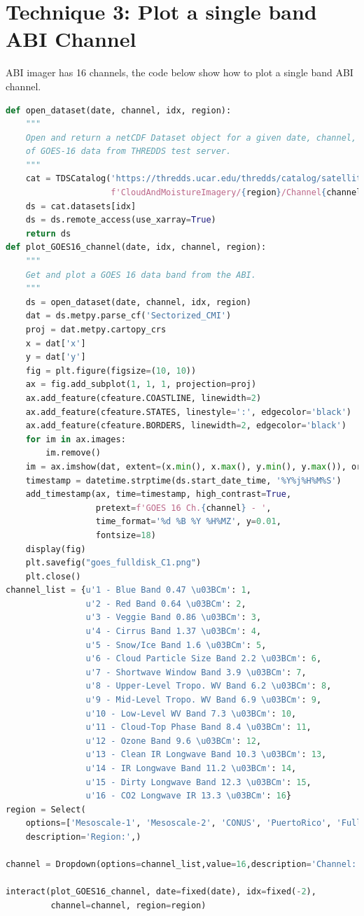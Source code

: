 \section{Technique 3: Plot a single band ABI Channel}
ABI imager has 16 channels, the code below show how to plot a single band ABI channel.
\begin{lstlisting}[language=Python]
def open_dataset(date, channel, idx, region):
    """
    Open and return a netCDF Dataset object for a given date, channel, and image index
    of GOES-16 data from THREDDS test server.
    """
    cat = TDSCatalog('https://thredds.ucar.edu/thredds/catalog/satellite/goes/east/products/'
                     f'CloudAndMoistureImagery/{region}/Channel{channel:02d}/{date:%Y%m%d}/catalog.xml')
    ds = cat.datasets[idx]
    ds = ds.remote_access(use_xarray=True)   
    return ds
def plot_GOES16_channel(date, idx, channel, region):
    """
    Get and plot a GOES 16 data band from the ABI.
    """
    ds = open_dataset(date, channel, idx, region)
    dat = ds.metpy.parse_cf('Sectorized_CMI')
    proj = dat.metpy.cartopy_crs
    x = dat['x']
    y = dat['y']
    fig = plt.figure(figsize=(10, 10))
    ax = fig.add_subplot(1, 1, 1, projection=proj)
    ax.add_feature(cfeature.COASTLINE, linewidth=2)
    ax.add_feature(cfeature.STATES, linestyle=':', edgecolor='black')
    ax.add_feature(cfeature.BORDERS, linewidth=2, edgecolor='black')
    for im in ax.images:
        im.remove()
    im = ax.imshow(dat, extent=(x.min(), x.max(), y.min(), y.max()), origin='upper')
    timestamp = datetime.strptime(ds.start_date_time, '%Y%j%H%M%S')
    add_timestamp(ax, time=timestamp, high_contrast=True, 
                  pretext=f'GOES 16 Ch.{channel} - ',
                  time_format='%d %B %Y %H%MZ', y=0.01,
                  fontsize=18)
    display(fig)
    plt.savefig("goes_fulldisk_C1.png")
    plt.close()
channel_list = {u'1 - Blue Band 0.47 \u03BCm': 1,
                u'2 - Red Band 0.64 \u03BCm': 2,
                u'3 - Veggie Band 0.86 \u03BCm': 3,
                u'4 - Cirrus Band 1.37 \u03BCm': 4,
                u'5 - Snow/Ice Band 1.6 \u03BCm': 5,
                u'6 - Cloud Particle Size Band 2.2 \u03BCm': 6,
                u'7 - Shortwave Window Band 3.9 \u03BCm': 7,
                u'8 - Upper-Level Tropo. WV Band 6.2 \u03BCm': 8,
                u'9 - Mid-Level Tropo. WV Band 6.9 \u03BCm': 9,
                u'10 - Low-Level WV Band 7.3 \u03BCm': 10,
                u'11 - Cloud-Top Phase Band 8.4 \u03BCm': 11,
                u'12 - Ozone Band 9.6 \u03BCm': 12,
                u'13 - Clean IR Longwave Band 10.3 \u03BCm': 13,
                u'14 - IR Longwave Band 11.2 \u03BCm': 14,
                u'15 - Dirty Longwave Band 12.3 \u03BCm': 15,
                u'16 - CO2 Longwave IR 13.3 \u03BCm': 16}
region = Select(
    options=['Mesoscale-1', 'Mesoscale-2', 'CONUS', 'PuertoRico', 'FullDisk'],
    description='Region:',)

channel = Dropdown(options=channel_list,value=16,description='Channel:',)

interact(plot_GOES16_channel, date=fixed(date), idx=fixed(-2), 
         channel=channel, region=region)

\end{lstlisting}

